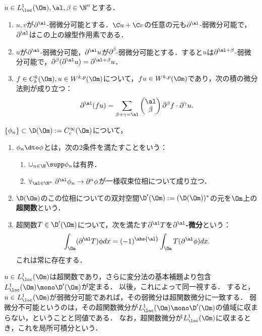 \documentclass[uplatex, dvipdfmx]{jsreport}
\begin{document}
\begin{proposition}
    $u\in L^1_\loc(\Om),\al,\beta\in\N^n$とする．
    \begin{enumerate}
        \item $u,v$が$\partial^\al$-弱微分可能とする．$\C u+\C v$の任意の元も$\partial^\al$-弱微分可能で，$\partial^\al$はこの上の線型作用素である．
        \item $u$が$\partial^\al$-弱微分可能，$\partial^\al u$が$\partial^\beta$-弱微分可能とする．すると$u$は$\partial^{\al+\beta}$-弱微分可能で，$\partial^\beta(\partial^\al u)=\partial^{\al+\beta}u$．
        \item $f\in C^k_b(\Om),u\in W^{k,p}(\Om)$について，$fu\in W^{k,p}(\Om)$であり，次の積の微分法則が成り立つ：
        \[\partial^\al(fu)=\sum_{\beta+\gamma=\al} \begin{pmatrix}\al\\\beta\end{pmatrix}\partial^\beta  f\cdot\partial^\gamma u.\]
    \end{enumerate}
\end{proposition}

\begin{definition}[超関数]
    $\{\phi_n\}\subset\D(\Om):=C^\infty_c(\Om)$について，
    \begin{enumerate}
        \item $\phi_n\dto\phi$とは，次の2条件を満たすことをいう：
        \begin{enumerate}
            \item $\cup_{n\in\N}\supp\phi_n$は有界．
            \item $\forall_{\al\in\N^n}\;\partial^\al\phi_n\to\partial^n\phi$が一様収束位相について成り立つ．
        \end{enumerate}
        \item $\D(\Om)$のこの位相についての双対空間$\D'(\Om):=(\D(\Om))^*$の元を$\Om$上の\textbf{超関数}という．
        \item 超関数$T\in\D'(\Om)$について，次を満たす$\partial^\al T$を\textbf{$\partial^\al$-微分}という：
        \[\int_\Om(\partial^\al T)\phi dx=(-1)^{\abs{\al}}\int_\Om T(\partial^\al\phi)dx.\]
        これは常に存在する．
    \end{enumerate}
\end{definition}
\begin{example}
    $u\in L^1_\loc(\Om)$は超関数であり，さらに変分法の基本補題より包含$L^1_\loc(\Om)\mono\D'(\Om)$が定まる．
    以後，これによって同一視する．
    すると，$u\in L^1_\loc(\Om)$が弱微分可能であれば，その弱微分は超関数微分に一致する．
    弱微分不可能というのは，その超関数微分が$L^1_\loc(\Om)\mono\D'(\Om)$の値域に収まらない，ということと同値である．
    なお，超関数微分が$L^1_\loc(\Om)$に収まるとき，これを局所可積分という．
\end{example}
\end{document}
